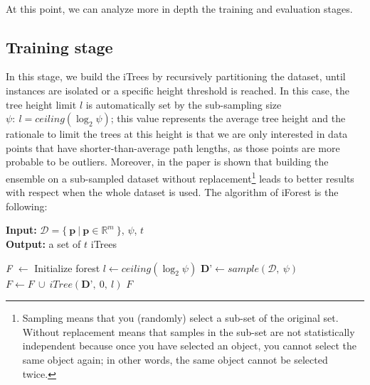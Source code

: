 \paragraph{}
At this point, we can analyze more in depth the training and evaluation stages.

\subsection{Training stage}
In this stage, we build the iTrees by recursively partitioning the dataset, until instances are isolated or a specific height threshold is reached. In this case, the tree height limit $l$ is automatically set by the sub-sampling size $\psi:\ l = ceiling(\log_2 \psi)$; this value represents the average tree height and the rationale to limit the trees at this height is that we are only interested in data points that have shorter-than-average path lengths, as those points are more probable to be outliers. \newline
Moreover, in the paper is shown that building the ensemble on a sub-sampled dataset without replacement\footnote{Sampling means that you (randomly) select a sub-set of the original set. Without replacement means that samples in the sub-set are not statistically independent because once you have selected an object, you cannot select the same object again; in other words, the same object cannot be selected twice.} leads to better results with respect when the whole dataset is used. \newline
The algorithm of iForest is the following:

\begin{algorithm}[h!]
    \caption{$iForest(\mathcal{D},\ \psi,\ t)$}
    \label{alg:iFor}
    \textbf{Input:} $\mathcal{D} = \{\ \textbf{p}\ |\ \textbf{p} \in \mathbb{R}^m\ \}$, $\psi$, $t$\\
    \textbf{Output:} a set of $t$ iTrees
    \begin{algorithmic}[1]
    \State \textit{F} $\gets$ Initialize forest
    \State $l \gets ceiling(\log_2 \psi)$ 
        \State $\textbf{D'} \gets sample(\mathcal{D},\ \psi)$
        \State $F \gets F\ \cup\ iTree(\textbf{D'},\ 0,\ l)$
    \EndFor
    \State \Return $F$
    \end{algorithmic}
\end{algorithm}

